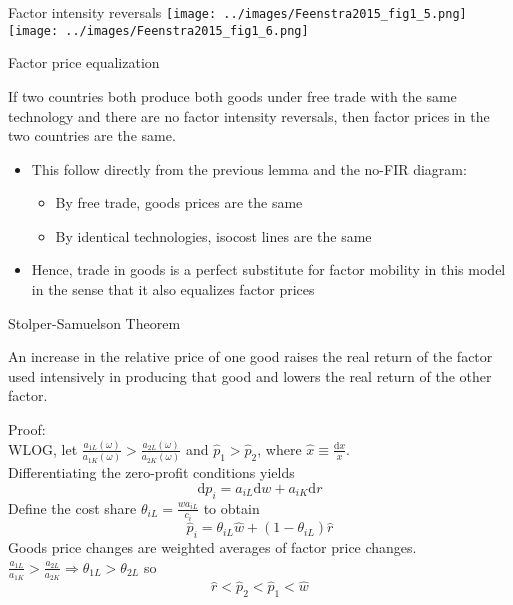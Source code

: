 \documentclass[10pt,notes=hide]{beamer}
\begin{document}
\begin{frame}{Factor intensity reversals}
\texttt{[image: ../images/Feenstra2015\_fig1\_5.png]}
\texttt{[image: ../images/Feenstra2015\_fig1\_6.png]}
\end{frame}
\begin{frame}{Factor price equalization}
\begin{theorem}
If two countries both produce both goods under free trade with the same technology and there are no factor intensity reversals,
then factor prices in the two countries are the same.
\end{theorem}
\begin{itemize}
	\item This follow directly from the previous lemma and the no-FIR diagram:
	\begin{itemize}
		\item By free trade, goods prices are the same
		\item By identical technologies, isocost lines are the same
	\end{itemize}
	\item Hence, trade in goods is a perfect substitute for factor mobility in this model in the sense that it also equalizes factor prices
\end{itemize}
\end{frame}
\begin{frame}{Stolper-Samuelson Theorem}
\begin{theorem}
An increase in the relative price of one good raises the real return of the factor used intensively in producing that good and lowers the real return of the other factor.
\end{theorem}
Proof:\\
WLOG, let $\frac{a_{1L}(\omega)}{a_{1K}(\omega)}>\frac{a_{2L}(\omega)}{a_{2K}(\omega)}$
and $\hat{p}_{1}>\hat{p}_{2}$,
where $\hat{x} \equiv \frac{\textrm{d}x}{x}$. \\
Differentiating the zero-profit conditions yields
\begin{equation*}
\textrm{d}p_{i}=a_{iL}\textrm{d}w+a_{iK}\textrm{d}r
\end{equation*}
Define the cost share $\theta _{iL}=\frac{wa_{iL}}{c_{i}}$
to obtain
\begin{equation*}
\hat{p}_{i}=\theta _{iL}\hat{w}+\left( 1-\theta _{iL}\right) \hat{r}
\end{equation*}
Goods price changes are weighted averages of factor price changes.
$\frac{a_{1L}}{a_{1K}}>\frac{a_{2L}}{a_{2K}} \Rightarrow \theta
_{1L}>\theta _{2L}$
so 
\begin{equation*}
\hat{r}<\hat{p}_{2}<\hat{p}_{1}<\hat{w}
\end{equation*}
\end{frame}
\end{document}
